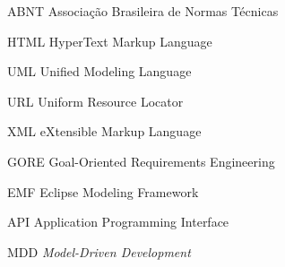 \documentclass[
	12pt,				%
	openright,			%
	oneside,
	a4paper,			%
	english,			%
	french,				%
	spanish,			%
	brazil				%
	]{abntex2}
\newcommand{\mdd}{\textit{Model-Driven Development}\xspace}
\begin{document}
\listoffigures*
\cleardoublepage


\listoftables*
\cleardoublepage


\begin{siglas}
  
  \item[ABNT] Associação Brasileira de Normas Técnicas
  
  \item[HTML] HyperText Markup Language

  \item[UML] Unified Modeling Language 

  \item[URL] Uniform Resource Locator
    
  \item[XML] eXtensible Markup Language
  
  \item[GORE] Goal-Oriented Requirements Engineering
  
  \item[EMF] Eclipse Modeling Framework
  
  \item[API] Application Programming Interface
  
  \item[MDD] \mdd
  
  
\end{siglas}



\tableofcontents*
\cleardoublepage




\textual







\end{document}
